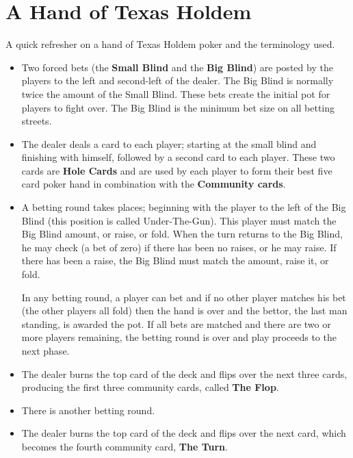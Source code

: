 \chapter{A Hand of Texas Holdem}


A quick refresher on a hand of Texas Holdem poker and the terminology
used.

\begin{itemize}

\item Two forced bets (the \textbf{Small Blind} and the \textbf{Big
  Blind}) are posted by   the players to the left and second-left of
  the dealer. The Big Blind   is normally twice the amount of the
  Small Blind. These bets create the initial pot for players to
  fight over. The Big Blind is the minimum bet size on all betting streets.
  
\item The dealer deals a card to each player; starting at the small
  blind and finishing with himself, followed by a second card to each
  player. These two cards are \textbf{Hole Cards} and are used by each
  player to form their best five card poker hand in combination with
  the \textbf{Community cards}.
  
\item A betting round takes places; beginning with the player to the
  left of the Big Blind (this position is called Under-The-Gun). This
  player must match the Big Blind amount, or raise, or fold. When the
  turn returns to the Big Blind, he may check (a bet of zero) if there
  has been no raises, or he may raise. If there has been a raise, the
  Big Blind must match the amount, raise it, or fold.

  In any betting round, a player can bet and if no other player
  matches his bet (the other players all fold) then the hand is over
  and the bettor, the last man standing, is awarded the pot.
  If all bets are matched and there are two or more players remaining,
  the betting round is over and play proceeds to the next phase.
  
\item The dealer burns the top card of the deck and flips over the
  next three cards, producing the first three community cards, called
  \textbf{The Flop}.

\item There is another betting round.

\item The dealer burns the top card of the deck and flips over the
  next card, which becomes the fourth community card, \textbf{The
    Turn}.


\end{itemize}
